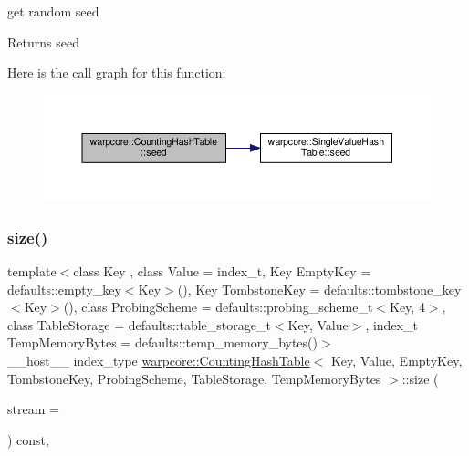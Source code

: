 get random seed 

\begin{DoxyReturn}{Returns}
seed 
\end{DoxyReturn}
Here is the call graph for this function\+:
\nopagebreak
\begin{figure}[H]
\begin{center}
\leavevmode
\includegraphics[width=350pt]{classwarpcore_1_1CountingHashTable_a404f39442f096f294cd879b0710e5416_cgraph}
\end{center}
\end{figure}
\mbox{\label{classwarpcore_1_1CountingHashTable_aa331f755c38f5b073ed7e58e3ad59777}} 
\subsubsection{\texorpdfstring{size()}{size()}}
{\footnotesize\ttfamily template$<$class Key , class Value  = index\+\_\+t, Key Empty\+Key = defaults\+::empty\+\_\+key$<$\+Key$>$(), Key Tombstone\+Key = defaults\+::tombstone\+\_\+key$<$\+Key$>$(), class Probing\+Scheme  = defaults\+::probing\+\_\+scheme\+\_\+t$<$\+Key, 4$>$, class Table\+Storage  = defaults\+::table\+\_\+storage\+\_\+t$<$\+Key, Value$>$, index\+\_\+t Temp\+Memory\+Bytes = defaults\+::temp\+\_\+memory\+\_\+bytes()$>$ \\
\+\_\+\+\_\+host\+\_\+\+\_\+ index\+\_\+type \hyperlink{classwarpcore_1_1CountingHashTable}{warpcore\+::\+Counting\+Hash\+Table}$<$ Key, Value, Empty\+Key, Tombstone\+Key, Probing\+Scheme, Table\+Storage, Temp\+Memory\+Bytes $>$\+::size (\begin{DoxyParamCaption}\item[{cuda\+Stream\+\_\+t}]{stream = {} }\end{DoxyParamCaption}) const\hspace{0.3cm}{\ttfamily [inline]}, {\ttfamily [noexcept]}}



